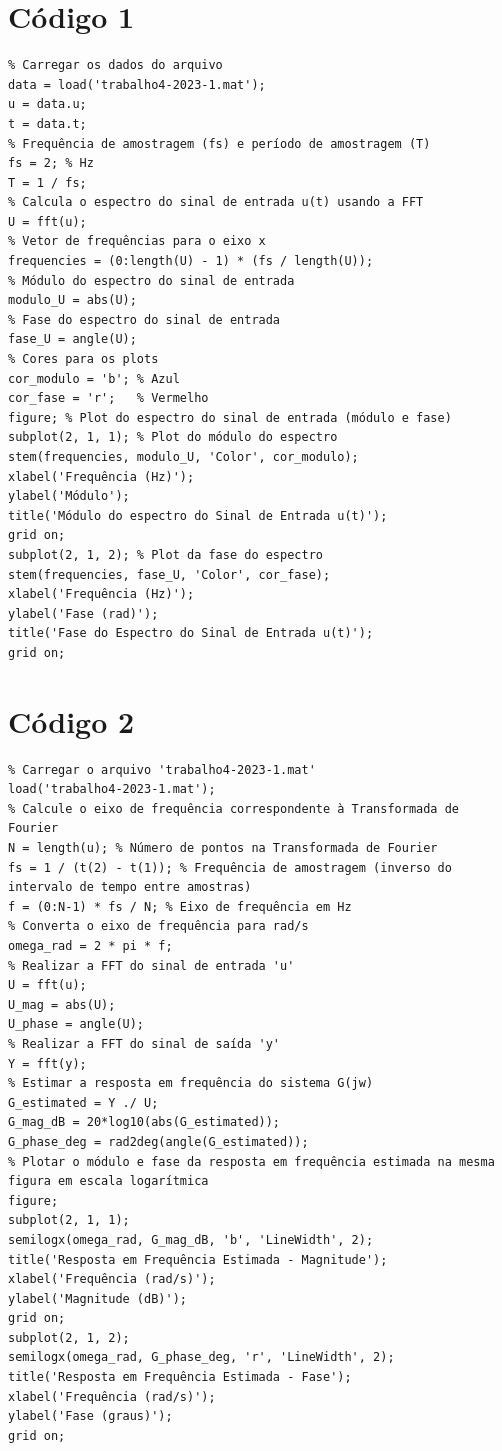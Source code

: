 \documentclass[10pt]{article}
\begin{document}
\begin{appendices}

\section{Código 1}

\begin{verbatim}
% Carregar os dados do arquivo
data = load('trabalho4-2023-1.mat');
u = data.u;
t = data.t;
% Frequência de amostragem (fs) e período de amostragem (T)
fs = 2; % Hz 
T = 1 / fs;
% Calcula o espectro do sinal de entrada u(t) usando a FFT
U = fft(u); 
% Vetor de frequências para o eixo x
frequencies = (0:length(U) - 1) * (fs / length(U));
% Módulo do espectro do sinal de entrada
modulo_U = abs(U);
% Fase do espectro do sinal de entrada
fase_U = angle(U);
% Cores para os plots
cor_modulo = 'b'; % Azul
cor_fase = 'r';   % Vermelho
figure; % Plot do espectro do sinal de entrada (módulo e fase)
subplot(2, 1, 1); % Plot do módulo do espectro
stem(frequencies, modulo_U, 'Color', cor_modulo);
xlabel('Frequência (Hz)');
ylabel('Módulo');
title('Módulo do espectro do Sinal de Entrada u(t)');
grid on;
subplot(2, 1, 2); % Plot da fase do espectro
stem(frequencies, fase_U, 'Color', cor_fase);
xlabel('Frequência (Hz)');
ylabel('Fase (rad)');
title('Fase do Espectro do Sinal de Entrada u(t)');
grid on;
\end{verbatim}

\newpage

\section{Código 2}

\begin{verbatim}
% Carregar o arquivo 'trabalho4-2023-1.mat'
load('trabalho4-2023-1.mat');
% Calcule o eixo de frequência correspondente à Transformada de Fourier
N = length(u); % Número de pontos na Transformada de Fourier
fs = 1 / (t(2) - t(1)); % Frequência de amostragem (inverso do intervalo de tempo entre amostras)
f = (0:N-1) * fs / N; % Eixo de frequência em Hz
% Converta o eixo de frequência para rad/s
omega_rad = 2 * pi * f;
% Realizar a FFT do sinal de entrada 'u'
U = fft(u);
U_mag = abs(U);
U_phase = angle(U);
% Realizar a FFT do sinal de saída 'y'
Y = fft(y);
% Estimar a resposta em frequência do sistema G(jw)
G_estimated = Y ./ U;
G_mag_dB = 20*log10(abs(G_estimated));
G_phase_deg = rad2deg(angle(G_estimated));
% Plotar o módulo e fase da resposta em frequência estimada na mesma figura em escala logarítmica
figure;
subplot(2, 1, 1);
semilogx(omega_rad, G_mag_dB, 'b', 'LineWidth', 2);
title('Resposta em Frequência Estimada - Magnitude');
xlabel('Frequência (rad/s)');
ylabel('Magnitude (dB)');
grid on;
subplot(2, 1, 2);
semilogx(omega_rad, G_phase_deg, 'r', 'LineWidth', 2);
title('Resposta em Frequência Estimada - Fase');
xlabel('Frequência (rad/s)');
ylabel('Fase (graus)');
grid on;
\end{verbatim}


\end{appendices}
\end{document}
